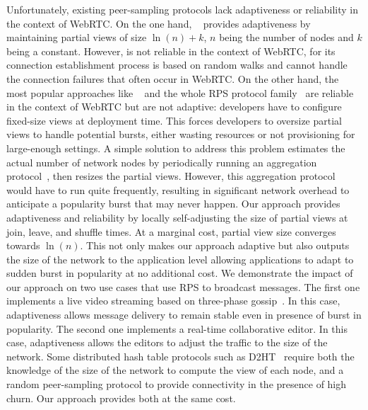 Unfortunately, existing peer-sampling protocols lack adaptiveness or
reliability in the context of WebRTC. On the one hand,
\SCAMP~\cite{ganesh2001scamp,ganesh2003peer} provides adaptiveness by
maintaining partial views of size $\ln(n)+k$, $n$ being the number of
nodes and $k$ being a constant. However, \SCAMP is not reliable in the
context of WebRTC, for its connection establishment process is based
on random walks and cannot handle the connection failures that often
occur in WebRTC. On the other hand, the most popular approaches like
\CYCLON~\cite{voulgaris2005cyclon} and the whole RPS protocol
family~\cite{jelasity2007gossip} are reliable in the context of WebRTC
but are not adaptive: developers have to configure fixed-size views at
deployment time. This forces developers to oversize partial views to
handle potential bursts, either wasting resources or not provisioning
for large-enough settings. A simple solution to address this problem
estimates the actual number of network nodes by periodically running
an aggregation protocol~\cite{montresor2004robust}, then resizes the
partial views. However, this aggregation protocol would have to run
quite frequently, resulting in significant network overhead to
anticipate a popularity burst that may never happen. Our approach
provides adaptiveness and reliability by locally self-adjusting the
size of partial views at join, leave, and shuffle times. At a marginal
cost, partial view size converges towards $\ln(n)$. This not only
makes our approach adaptive but also outputs the size of the network
to the application level allowing applications to adapt to sudden
burst in popularity at no additional cost. We demonstrate the impact
of our approach on two use cases that use RPS to broadcast
messages. The first one implements a live video streaming based on
three-phase gossip~\cite{Frey09DSN,FlightPath,monod:THESIS}. In this
case, adaptiveness allows message delivery to remain stable even in
presence of burst in popularity. The second one implements a real-time
collaborative editor. In this case, adaptiveness allows the editors to
adjust the traffic to the size of the network. Some distributed hash
table protocols such as D2HT~\cite{bertier-d2ht} require both the
knowledge of the size of the network to compute the view of each node,
and a random peer-sampling protocol to provide connectivity in the
presence of high churn. Our approach provides both at the same cost.


